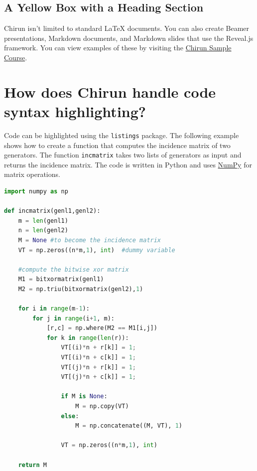 \documentclass{article} %
\begin{document}
\subsection{A Yellow Box with a Heading Section}
\begin{tcolorbox}[colback=Goldenrod!10,colframe=Goldenrod!60!black,
    colbacktitle=Goldenrod!70!black,title=Tip]
    Chirun isn't limited to standard LaTeX documents. You can also create Beamer presentations, Markdown documents, and Markdown slides that use the Reveal.js framework. You can view examples of these by visiting the \href{https://www.chirun.org.uk/demo/}{Chirun Sample Course}.
\end{tcolorbox}

\section{How does Chirun handle code syntax highlighting?}

Code can be highlighted using the \verb|listings| package. The following example shows how to create a function that computes the incidence matrix of two generators.
The function \verb|incmatrix| takes two lists of generators as input and returns the incidence matrix. The code is written in Python and uses \href{https://numpy.org/}{NumPy} for matrix operations.

\begin{lstlisting}[language=Python, caption=Python example]
import numpy as np
    
def incmatrix(genl1,genl2):
    m = len(genl1)
    n = len(genl2)
    M = None #to become the incidence matrix
    VT = np.zeros((n*m,1), int)  #dummy variable
    
    #compute the bitwise xor matrix
    M1 = bitxormatrix(genl1)
    M2 = np.triu(bitxormatrix(genl2),1) 

    for i in range(m-1):
        for j in range(i+1, m):
            [r,c] = np.where(M2 == M1[i,j])
            for k in range(len(r)):
                VT[(i)*n + r[k]] = 1;
                VT[(i)*n + c[k]] = 1;
                VT[(j)*n + r[k]] = 1;
                VT[(j)*n + c[k]] = 1;
                
                if M is None:
                    M = np.copy(VT)
                else:
                    M = np.concatenate((M, VT), 1)
                
                VT = np.zeros((n*m,1), int)
    
    return M
\end{lstlisting}
\end{document}
